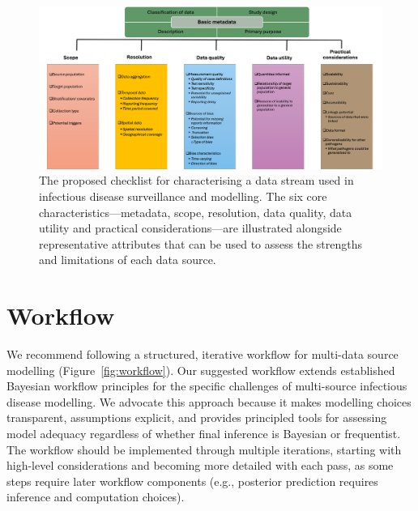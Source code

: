\documentclass{article}
\begin{document}
\begin{figure}[H] 
\includegraphics[width=1\linewidth]{figures/data_characteristics_2.png}
\centering
\caption{The proposed checklist for characterising a data stream used in infectious disease surveillance and modelling. The six core characteristics---metadata, scope, resolution, data quality, data utility and practical considerations---are illustrated alongside representative attributes that can be used to assess the strengths and limitations of each data source. }
\label{data_characteristics}
\end{figure}


\section{Workflow}
\label{sec:workflow}

We recommend following a structured, iterative workflow for multi-data source modelling (Figure~\ref{fig:workflow}). Our suggested workflow extends established Bayesian workflow principles \citep{gelman2020bayesian} for  the specific challenges of multi-source infectious disease modelling.
We advocate this approach because it makes modelling choices transparent, assumptions explicit, and provides principled tools for assessing model adequacy regardless of whether final inference is Bayesian or frequentist.
The workflow should be implemented through multiple iterations, starting with high-level considerations and becoming more detailed with each pass, as some steps require later workflow components (e.g., posterior prediction requires inference and computation choices).
\end{document}
